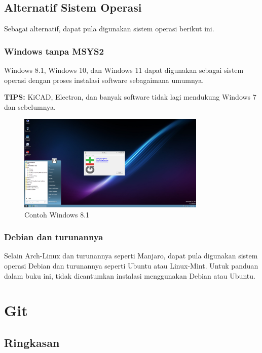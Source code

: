 \documentclass[12pt]{book}
\begin{document}
	\section{Alternatif Sistem Operasi}
	
	Sebagai alternatif, dapat pula digunakan sistem operasi berikut ini.
	
	\subsection{Windows tanpa MSYS2}
	
	Windows 8.1, Windows 10, dan Windows 11 dapat digunakan sebagai sistem operasi dengan proses instalasi software sebagaimana umumnya.
	
	\textbf{TIPS:} KiCAD, Electron, dan banyak software tidak lagi mendukung Windows 7 dan sebelumnya.
	
	\begin{figure}[!ht]
		\centering
		\includegraphics[width=0.8\textwidth]{images/os/windows}
		\caption{Contoh Windows 8.1}
	\end{figure}
	
	\subsection{Debian dan turunannya}
	
	Selain Arch-Linux dan turunannya seperti Manjaro, dapat pula digunakan sistem operasi Debian dan turunannya seperti Ubuntu atau Linux-Mint.
	Untuk panduan dalam buku ini, tidak dicantumkan instalasi menggunakan Debian atau Ubuntu.
	
	
	\newpage
	\chapter{Git}
	
	\section{Ringkasan}
	
\end{document}
